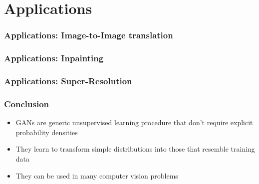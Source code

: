 \documentclass[10pt,mathserif]{beamer}
\begin{document}
\section{Applications}
\label{sec:applications}

\begin{frame}
  \frametitle{Applications: Image-to-Image translation}
\end{frame}

\begin{frame}
  \frametitle{Applications: Inpainting}
\end{frame}

\begin{frame}
  \frametitle{Applications: Super-Resolution}
\end{frame}

\begin{frame}
  \frametitle{Conclusion}
  \begin{itemize}
    \item GANs are generic unsupervised learning procedure that don't require
      explicit probability densities
    \item They learn to transform simple distributions into those that resemble training data
    \item They can be used in many computer vision problems
  \end{itemize}
\end{frame}


\end{document}
